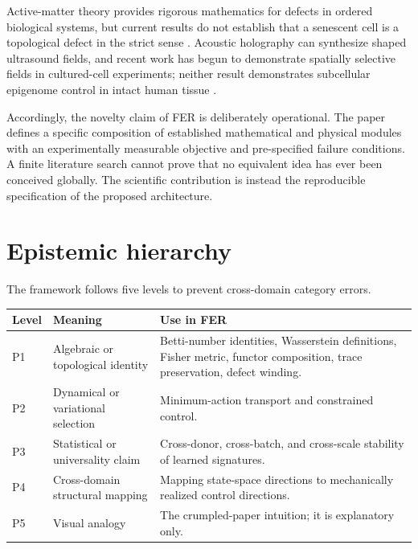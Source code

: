 \documentclass[11pt]{article}
\begin{document}
Active-matter theory provides rigorous mathematics for defects in ordered biological systems, but current results do not establish that a senescent cell is a topological defect in the strict sense \cite{marchetti2013,angheluta2026,beer2026}. Acoustic holography can synthesize shaped ultrasound fields, and recent work has begun to demonstrate spatially selective fields in cultured-cell experiments; neither result demonstrates subcellular epigenome control in intact human tissue \cite{burstow2025,fujita2026}.

Accordingly, the novelty claim of FER is deliberately operational. The paper defines a specific composition of established mathematical and physical modules with an experimentally measurable objective and pre-specified failure conditions. A finite literature search cannot prove that no equivalent idea has ever been conceived globally. The scientific contribution is instead the reproducible specification of the proposed architecture.

\section{Epistemic hierarchy}
The framework follows five levels to prevent cross-domain category errors.
\begin{longtable}{p{}p{}p{}}
\toprule
Level & Meaning & Use in FER \\
\midrule
P1 & Algebraic or topological identity & Betti-number identities, Wasserstein definitions, Fisher metric, functor composition, trace preservation, defect winding. \\
P2 & Dynamical or variational selection & Minimum-action transport and constrained control. \\
P3 & Statistical or universality claim & Cross-donor, cross-batch, and cross-scale stability of learned signatures. \\
P4 & Cross-domain structural mapping & Mapping state-space directions to mechanically realized control directions. \\
P5 & Visual analogy & The crumpled-paper intuition; it is explanatory only. \\
\bottomrule
\end{longtable}
\end{document}
